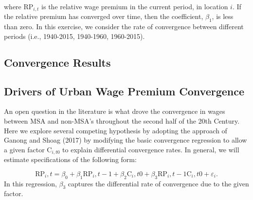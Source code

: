 \documentclass[12pt,twoside]{article}
\begin{document}
where $\text{RP}_{i,t}$ is the relative wage premium in the current period, in location $i$.
If the relative premium has converged over time, then the coefficient, $\beta_1$, is less than zero. 
In this exercise, we consider the rate of convergence between different periods (i.e., 1940-2015, 1940-1960, 1960-2015). 

\subsection{Convergence Results}


\subsection{Drivers of Urban Wage Premium Convergence}
An open question in the literature is what drove the convergence in wages between MSA and non-MSA's throughout the second half of the 20th Century. 
Here we explore several competing hypothesis by adopting the approach of Ganong and Shoag (2017) by modifying the basic convergence regression to allow a given factor $\text{C}_{i,t0}$ to explain differential convergence rates. 
In general, we will estimate specifications of the following form:

\begin{equation}
    \label{eq:converge_2}
    \text{RP}_i,t = \beta_0 + \beta_1 \text{RP}_i,t-1 +\beta_2 \text{C}_i,t0+ \beta_3 \text{RP}_i,t-1 \text{C}_i,t0 + \varepsilon_i.
\end{equation}
In this regression, $\beta_3$ captures the differential rate of convergence due to the given factor. 
\end{document}
